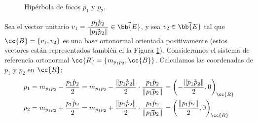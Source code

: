 \begin{ejercicio}
\begin{enumerate}
\begin{figure}[H]
        \caption{Hipérbola de focos $p_1$ y $p_2$.}  
        \label{fig:ej5.3.7.Hiperbola}      
    \end{figure}
    Sea el vector unitario $v_1=\dfrac{\vec{p_1p_2}}{\left\|\vec{p_1p_2}\right\|}\in \vec{\bb{E}}$, y sea $v_2\in \vec{\bb{E}}$ tal que $\cc{B}=\{v_1,v_2\}$ es una base ortonormal orientada positivamente (estos vectores están representados también el la Figura \ref{fig:ej5.3.7.Hiperbola}).
    Consideramos el sistema de referencia ortonormal $\cc{R}=\{m_{p_1p_2},\cc{B}\}$. Calculamos las coordenadas de $p_1$ y $p_2$ en $\cc{R}$:
    \begin{align*}
        p_1 &= m_{p_1p_2} - \frac{\vec{p_1p_2}}{2} = m_{p_1p_2} - \frac{\left\|\vec{p_1p_2}\right\|}{2}\cdot \frac{\vec{p_1p_2}}{\left\|\vec{p_1p_2}\right\|} = \left(-\frac{\left\|\vec{p_1p_2}\right\|}{2}, 0\right)_{\cc{R}} \\
        p_2 &= m_{p_1p_2} + \frac{\vec{p_1p_2}}{2} = m_{p_1p_2} + \frac{\left\|\vec{p_1p_2}\right\|}{2}\cdot \frac{\vec{p_1p_2}}{\left\|\vec{p_1p_2}\right\|} = \left(\frac{\left\|\vec{p_1p_2}\right\|}{2}, 0\right)_{\cc{R}}
    \end{align*}


\end{enumerate}
\end{ejercicio}
